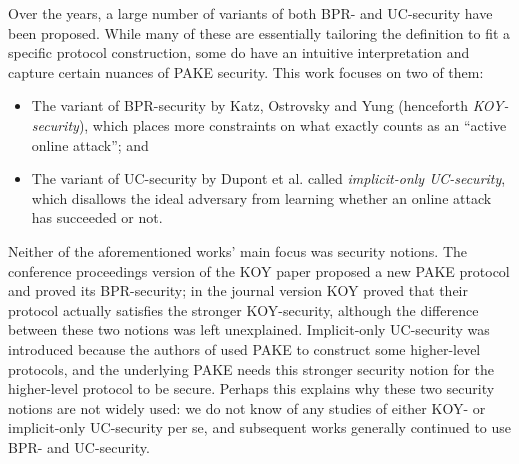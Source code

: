 \documentclass{article}
\begin{document}
Over the years, a large number of variants of both BPR- and UC-security have been proposed. While many of these are essentially tailoring the definition to fit a specific protocol construction, some do have an intuitive interpretation and capture certain nuances of PAKE security. This work focuses on two of them:
\begin{itemize}
  \item The variant of BPR-security by Katz, Ostrovsky and Yung \cite{JACM:KatOstYun09} (henceforth \emph{KOY-security}), which places more constraints on what exactly counts as an ``active online attack''; and
  \item The variant of UC-security by Dupont et al. \cite{EC:DHPRY18} called \emph{implicit-only UC-security}, which disallows the ideal adversary from learning whether an online attack has succeeded or not.
\end{itemize}
Neither of the aforementioned works' main focus was security notions. The conference proceedings version of the KOY paper \cite{EC:KatOstYun01} proposed a new PAKE protocol and proved its BPR-security; in the journal version \cite{JACM:KatOstYun09} KOY proved that their protocol actually satisfies the stronger KOY-security, although the difference between these two notions was left unexplained. Implicit-only UC-security was introduced because the authors of \cite{EC:DHPRY18} used PAKE to construct some higher-level protocols, and the underlying PAKE needs this stronger security notion for the higher-level protocol to be secure. Perhaps this explains why these two security notions are not widely used: we do not know of any studies of either KOY- or implicit-only UC-security per se, and subsequent works generally continued to use BPR- and UC-security.
\end{document}
